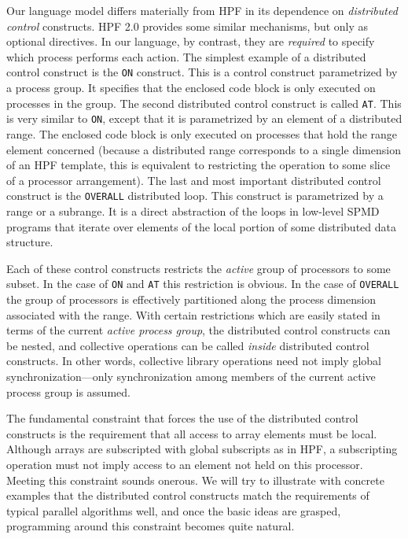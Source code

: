 Our language model differs materially from HPF in its
dependence on {\em distributed control} constructs.  HPF 2.0 provides
some similar mechanisms, but only as optional directives.  In our
language, by contrast, they are {\em required}
to specify which process performs each action.
The simplest example of a distributed control
construct is the {\tt ON} construct.  This is a control construct
parametrized by a process group.  It specifies that the enclosed code
block is only executed on processes in the group.  The second
distributed control construct is called {\tt AT}.  This is very similar
to {\tt ON}, except that it is parametrized by an element of a
distributed range.  The enclosed code block is only executed on
processes that hold the range element concerned (because a distributed
range corresponds to a single dimension of an HPF template, this is
equivalent to restricting the operation to some slice of a processor
arrangement).  The last and most important distributed control
construct is the {\tt OVERALL} distributed loop.  This construct is
parametrized by a range or a subrange.  It is a direct abstraction
of the loops in low-level SPMD programs that iterate over elements
of the local portion of some distributed data structure.

Each of these control constructs restricts the {\em active} group
of processors to some subset.  In the case of {\tt ON} and {\tt AT}
this restriction is obvious.  In the case of {\tt OVERALL} the group of
processors is effectively partitioned along the process dimension
associated with the range.  With certain restrictions which are
easily stated in terms of the current {\em active process group},
the distributed control constructs can be nested, and collective
operations can be called {\em inside} distributed control constructs.
In other words, collective library operations need not imply global
synchronization---only synchronization among members of the current
active process group is assumed.

The fundamental constraint that forces the use of the distributed
control constructs is the requirement that all access to array elements
must be local.  Although arrays are subscripted with global subscripts
as in HPF, a subscripting operation must not imply access to an
element not held on this processor.  Meeting this constraint sounds
onerous.  We will try to illustrate with concrete examples that the
distributed control constructs match the requirements of typical
parallel algorithms well, and once the basic ideas are grasped,
programming around this constraint becomes quite natural.

